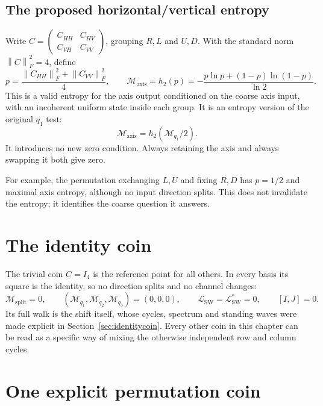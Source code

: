 \documentclass[11pt,a4paper,oneside]{report}
\newcommand{\Id}{I}
\newcommand{\norm}[1]{\left\lVert#1\right\rVert}
\newcommand{\sw}{\mathrm{SW}}
\numberwithin{equation}{chapter}
\begin{document}
\subsection{The proposed horizontal/vertical entropy}

Write \(C=\left(\begin{smallmatrix}C_{HH}&C_{HV}\\
C_{VH}&C_{VV}\end{smallmatrix}\right)\), grouping \(R,L\) and
\(U,D\). With the standard norm \(\norm C_F^2=4\), define
\begin{equation}
p=\frac{\norm{C_{HH}}_F^2+\norm{C_{VV}}_F^2}{4},\qquad
\mathcal M_{\mathrm{axis}}=h_2(p)
=-\frac{p\ln p+(1-p)\ln(1-p)}{\ln2}.
\end{equation}
This is a valid entropy for the axis output conditioned on the
coarse axis input, with an incoherent uniform state inside each group.
It is an entropy version of the original \(q_1\) test:
\begin{equation}
\boxed{\mathcal M_{\mathrm{axis}}
=h_2(\mathcal M_{q_1}/2).}
\end{equation}
It introduces no new zero condition. Always retaining the axis and
always swapping it both give zero.

For example, the permutation exchanging \(L,U\) and fixing \(R,D\)
has \(p=1/2\) and maximal axis entropy, although no input direction
splits. This does not invalidate the entropy; it identifies the
coarse question it answers.

\section{The identity coin}
\label{sec:identitylocal}

The trivial coin \(C=\Id_4\) is the reference point for all others. In
every basis its square is the identity, so no direction splits and no
channel changes:
\begin{equation}
\mathcal M_{\mathrm{split}}=0,\qquad
(\mathcal M_{q_1},\mathcal M_{q_2},\mathcal M_{q_3})=(0,0,0),\qquad
\mathcal L_{\sw}=\mathcal L^*_{\sw}=0,\qquad [\Id,J]=0 .
\end{equation}
Its full walk is the shift itself, whose cycles, spectrum and standing
waves were made explicit in Section~\ref{sec:identitycoin}. Every other
coin in this chapter can be read as a specific way of mixing the
otherwise independent row and column cycles.

\section{One explicit permutation coin}
\end{document}
